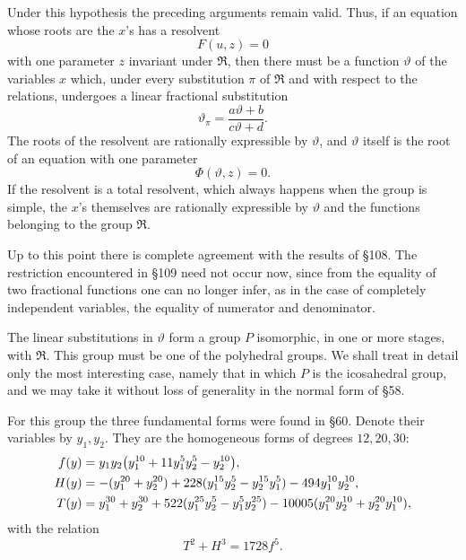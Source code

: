 \documentclass[12pt,a4paper]{article}
\begin{document}
Under this hypothesis the preceding arguments remain valid.  Thus, if an equation whose roots are the $x$'s has a resolvent
\begin{equation}
 F(u,z)=0
\end{equation}
with one parameter $z$ invariant under $\mathfrak R$, then there must be a function $\vartheta$ of the variables $x$ which, under every substitution $\pi$ of $\mathfrak R$ and with respect to the relations, undergoes a linear fractional substitution
\begin{equation}
 \vartheta_\pi=\frac{a\vartheta+b}{c\vartheta+d}.
\end{equation}
The roots of the resolvent are rationally expressible by $\vartheta$, and $\vartheta$ itself is the root of an equation with one parameter
\begin{equation}
 \Phi(\vartheta,z)=0.
\end{equation}
If the resolvent is a total resolvent, which always happens when the group is simple, the $x$'s themselves are rationally expressible by $\vartheta$ and the functions belonging to the group $\mathfrak R$.

Up to this point there is complete agreement with the results of \S 108.  The restriction encountered in \S 109 need not occur now, since from the equality of two fractional functions one can no longer infer, as in the case of completely independent variables, the equality of numerator and denominator.

The linear substitutions in $\vartheta$ form a group $P$ isomorphic, in one or more stages, with $\mathfrak R$.  This group must be one of the polyhedral groups.  We shall treat in detail only the most interesting case, namely that in which $P$ is the icosahedral group, and we may take it without loss of generality in the normal form of \S 58.

For this group the three fundamental forms were found in \S 60.  Denote their variables by $y_1,y_2$.  They are the homogeneous forms of degrees $12,20,30$:
\begin{align}
 f(y)&=y_1y_2\bigl(y_1^{10}+11y_1^5y_2^5-y_2^{10}\bigr),\notag\\
 H(y)&=-(y_1^{20}+y_2^{20})+228(y_1^{15}y_2^5-y_2^{15}y_1^5)-494y_1^{10}y_2^{10},\notag\\
 T(y)&=y_1^{30}+y_2^{30}+522(y_1^{25}y_2^5-y_1^5y_2^{25})
      -10005(y_1^{20}y_2^{10}+y_2^{20}y_1^{10}),
\end{align}
with the relation
\begin{equation}
 T^2+H^3=1728f^5.
\end{equation}
\end{document}
